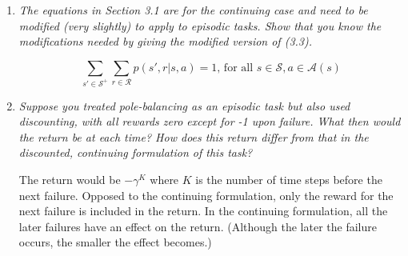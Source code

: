\documentclass[12pt,a4paper]{article}
\begin{document}
\begin{enumerate}
  \item
    \textit{The equations in Section 3.1 are for the continuing case and need to be
    modified (very slightly) to apply to episodic tasks. Show that you know the modifications
    needed by giving the modified version of (3.3).}

    \[
    \sum\limits_{s' \in \mathcal{S}^+} \sum\limits_{r \in \mathcal{R}} p(s', r | s, a) = 1 \text{, for all }
    s \in \mathcal{S}, a \in \mathcal{A}(s)
    \]

  \item
    \textit{Suppose you treated pole-balancing as an episodic task but also used
    discounting, with all rewards zero except for -1 upon failure. What then would the
    return be at each time? How does this return differ from that in the discounted, continuing
    formulation of this task?}

  The return would be $-\gamma^K$ where $K$ is the number of time steps before the next failure.
  Opposed to the continuing formulation, only the reward for the next failure is included
  in the return. In the continuing formulation, all the later failures have an effect on the
  return. (Although the later the failure occurs, the smaller the effect becomes.)

\end{enumerate}
\end{document}
